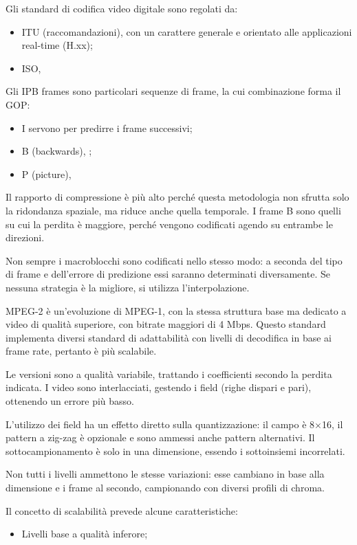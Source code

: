 Gli standard di codifica video digitale sono regolati da:
\begin{itemize}
	\item ITU (raccomandazioni), con un carattere generale e orientato alle applicazioni real-time (H.xx);
	\item ISO, 
\end{itemize}


Gli IPB frames sono particolari sequenze di frame, la cui combinazione forma il GOP:
\begin{itemize}
	\item I servono per predirre i frame successivi;
	\item B (backwards), ;
	\item P (picture), 
\end{itemize}

Il rapporto di compressione è più alto perché questa metodologia non sfrutta solo la ridondanza spaziale, ma riduce anche quella temporale. I frame B sono quelli su cui la perdita è maggiore, perché vengono codificati agendo su entrambe le direzioni.

Non sempre i macroblocchi sono codificati nello stesso modo: a seconda del tipo di frame e dell'errore di predizione essi saranno determinati diversamente. Se nessuna strategia è la migliore, si utilizza l'interpolazione.

MPEG-2 è un'evoluzione di MPEG-1, con la stessa struttura base ma dedicato a video di qualità superiore, con bitrate maggiori di 4 Mbps. Questo standard implementa diversi standard di adattabilità con livelli di decodifica in base ai frame rate, pertanto è più scalabile.

Le versioni sono a qualità variabile, trattando i coefficienti secondo la perdita indicata. I video sono interlacciati, gestendo i field (righe dispari e pari), ottenendo un errore più basso.

L'utilizzo dei field ha un effetto diretto sulla quantizzazione: il campo è 8$\times$16, il pattern a zig-zag è opzionale e sono ammessi anche pattern alternativi. Il sottocampionamento è solo in una dimensione, essendo i sottoinsiemi incorrelati. 

Non tutti i livelli ammettono le stesse variazioni: esse cambiano in base alla dimensione e i frame al secondo, campionando con diversi profili di chroma. 

Il concetto di scalabilità prevede alcune caratteristiche:
\begin{itemize}
	\item Livelli base a qualità inferore;
\end{itemize}

